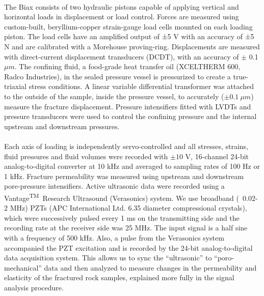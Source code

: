 \documentclass[letterpaper,10pt]{article}
\begin{document}
\paragraph{} The Biax consists of two hydraulic pistons capable of applying vertical and horizontal loads in displacement or load control. Forces are measured using custom-built, beryllium-copper strain-gauge load cells mounted on each loading piston. The load cells have an amplified output of ±5 V with an accuracy of ±5 N and are calibrated with a Morehouse proving-ring. Displacements are measured with direct-current displacement transducers (DCDT), with an accuracy of $\pm$ 0.1 $\mu m$. The confining fluid, a food-grade heat transfer oil (XCELTHERM 600, Radco Industries), in the sealed pressure vessel is pressurized to create a true-triaxial stress conditions. A linear variable differential transformer was attached to the outside of the sample, inside the pressure vessel, to accurately ($\pm 0.1\ \mu m$) measure the fracture displacement. Pressure intensifiers fitted with LVDTs and pressure transducers were used to control the confining pressure and the internal upstream and downstream pressures. 
\paragraph{} Each axis of loading is independently servo-controlled and all stresses, strains, fluid pressures and fluid volumes were recorded with $\pm10$ V, 16-channel 24-bit analog-to-digital converter at 10 kHz and averaged to sampling rates of 100 Hz or 1 kHz. Fracture permeability was measured using upstream and downstream pore-pressure intensifiers. Active ultrasonic data were recorded using a Vantage\textsuperscript{TM}\ Research Ultrasound (Verasonics) system. We use broadband (~0.02-2 MHz) PZTs (APC International Ltd. 6.35 diameter compressional crystals), which were successively pulsed every 1 ms on the transmitting side and the recording rate at the receiver side was 25 MHz. The input signal is a half sine with a frequency of 500 kHz. Also, a pulse from the Verasonics system accompanied the PZT excitation and is recorded by the 24-bit analog-to-digital data acquisition system. This allows us to sync the “ultrasonic” to “poro-mechanical” data and then analyzed to measure changes in the permeability and elasticity of the fractured rock samples, explained more fully in the signal analysis procedure.  
\end{document}
